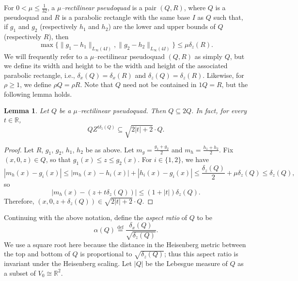 \documentclass[11pt,reqno]{amsart}
\newcommand{\R}{\mathbb{R}}
\newcommand{\0}{\mathbf{0}}
\renewcommand{\1}{\mathbf 1}
\renewcommand{\subset}{\subseteq}
\newcommand{\eqdef}{\stackrel{\mathrm{def}}{=}}
\renewcommand{\ge}{\geqslant}
\renewcommand{\le}{\leqslant}
\newtheorem{lemma}[thm]{Lemma}
\theoremstyle{remark}
\begin{document}
For $0<\mu\le \frac{1}{32}$, a \emph{$\mu$--rectilinear pseudoquad} is a pair $(Q,R)$, where $Q$ is a pseudoquad and $R$ is a parabolic rectangle with the same base $I$ as $Q$ such that, if $g_1$ and $g_2$ (respectively $h_1$ and $h_2$) are the lower and upper bounds of $Q$ (respectively $R$), then
\begin{equation}\label{eq:def rectilinear 1 and 2}
  \max\big \{\|g_1-h_1\|_{L_\infty(4I)},\|g_2-h_2\|_{L_\infty(4I)}\big\}\le \mu \delta_z(R).
\end{equation}
 We will frequently refer to a $\mu$--rectilinear pseudoquad $(Q,R)$ as simply $Q$, but we define its width and height to be the width and height of the associated parabolic rectangle, i.e., $\delta_x(Q)=\delta_x(R)$ and $\delta_z(Q)=\delta_z(R)$.  Likewise, for $\rho\ge 1$, we define $\rho Q=\rho R$.  Note that $Q$ need not be contained in $1 Q=R$, but the following lemma holds.
\begin{lemma}\label{lem:quad translates}
  Let $Q$ be a $\mu$--rectilinear pseudoquad.  Then $Q\subset 2Q$. In fact, for every $t\in \R$,
  $$ Q Z^{t \delta_z(Q)} \subset \sqrt{2|t|+2}\cdot Q.$$
\end{lemma}
\begin{proof}
  Let $R$, $g_1$, $g_2$, $h_1$, $h_2$ be as above.  Let $m_g=\frac{g_1+g_2}{2}$ and $m_h=\frac{h_1+h_2}{2}$.  Fix $(x,0,z)\in Q$, so that $g_1(x)\le z\le g_2(x)$.  For $i\in \{1,2\}$, we have
  $$|m_h(x)-g_i(x)|\le |m_h(x)-h_i(x)|+|h_i(x)-g_i(x)|\le \frac{\delta_z(Q)}{2}+\mu \delta_z(Q)\le \delta_z(Q),$$
  so
  $$\left|m_h(x)-\left(z+t \delta_z(Q)\right)\right|\le (1 + |t|) \delta_z(Q).$$
  Therefore, $(x,0,z+\delta_z(Q))\in \sqrt{2|t|+2}\cdot Q$.
\end{proof}
Continuing with the above notation, define  the \emph{aspect ratio} of $Q$ to be
\begin{equation}\label{eq:def aspect}
\alpha(Q)\eqdef \frac{\delta_x(Q)}{\sqrt{\delta_z(Q)}}.
\end{equation}
We use a square root here because the distance in the Heisenberg metric between the top and bottom of $Q$ is proportional to $\sqrt{\delta_z(Q)}$; thus this aspect ratio is invariant under the Heisenberg scaling.  Let $|Q|$ be the Lebesgue measure of $Q$ as a subset of $V_0\cong \R^2$.
\end{document}
